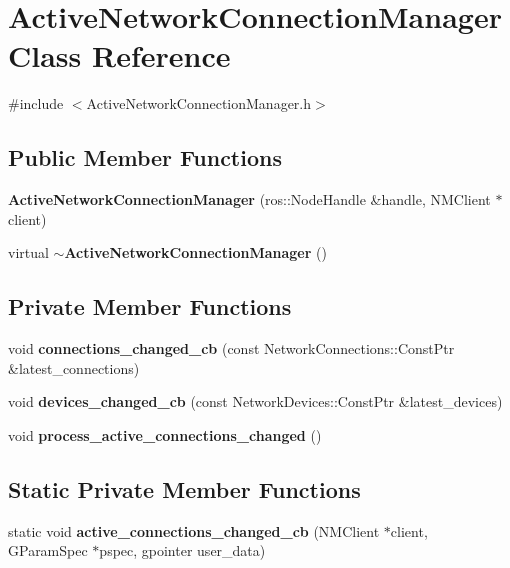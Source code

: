 \section{\-Active\-Network\-Connection\-Manager \-Class \-Reference}
\label{classActiveNetworkConnectionManager}


{\ttfamily \#include $<$\-Active\-Network\-Connection\-Manager.\-h$>$}

\subsection*{\-Public \-Member \-Functions}
\begin{DoxyCompactItemize}
\item 
{\bf \-Active\-Network\-Connection\-Manager} (ros\-::\-Node\-Handle \&handle, \-N\-M\-Client $\ast$client)
\item 
virtual {\bf $\sim$\-Active\-Network\-Connection\-Manager} ()
\end{DoxyCompactItemize}
\subsection*{\-Private \-Member \-Functions}
\begin{DoxyCompactItemize}
\item 
void {\bf connections\-\_\-changed\-\_\-cb} (const \-Network\-Connections\-::\-Const\-Ptr \&latest\-\_\-connections)
\item 
void {\bf devices\-\_\-changed\-\_\-cb} (const \-Network\-Devices\-::\-Const\-Ptr \&latest\-\_\-devices)
\item 
void {\bf process\-\_\-active\-\_\-connections\-\_\-changed} ()
\end{DoxyCompactItemize}
\subsection*{\-Static \-Private \-Member \-Functions}
\begin{DoxyCompactItemize}
\item 
static void {\bf active\-\_\-connections\-\_\-changed\-\_\-cb} (\-N\-M\-Client $\ast$client, \-G\-Param\-Spec $\ast$pspec, gpointer user\-\_\-data)
\end{DoxyCompactItemize}
